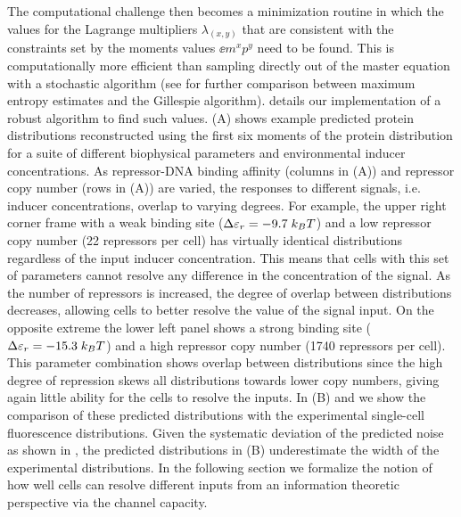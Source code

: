 The computational challenge then becomes a minimization routine in which the
values for the Lagrange multipliers $\lambda_{(x,y)}$ that are consistent with
the constraints set by the moments values $\ee{m^x p^y}$ need to be found. This
is computationally more efficient than sampling directly out of the master
equation with a stochastic algorithm (see  for further
comparison between maximum entropy estimates and the Gillespie algorithm).
 details our implementation of a robust algorithm to find
such values. (A) shows example predicted protein
distributions reconstructed using the first six moments of the protein
distribution for a suite of different biophysical parameters and environmental
inducer concentrations. As repressor-DNA binding affinity (columns in
(A)) and repressor copy number (rows in
(A)) are varied, the responses to different signals, i.e.
inducer concentrations, overlap to varying degrees. For example, the upper
right corner frame with a weak binding site ($\Delta\varepsilon_r = -9.7 \; k_BT$) and a low
repressor copy number (22 repressors per cell) has virtually identical
distributions regardless of the input inducer concentration. This means that
cells with this set of parameters cannot resolve any difference in the
concentration of the signal. As the number of repressors is increased, the
degree of overlap between distributions decreases, allowing cells to better
resolve the value of the signal input. On the opposite extreme the lower left
panel shows a strong binding site ($\Delta\varepsilon_r = -15.3 \; k_BT$) and a high repressor
copy number (1740 repressors per cell). This parameter combination shows
overlap between distributions since the high degree of repression skews all
distributions towards lower copy numbers, giving again little ability for the
cells to resolve the inputs. In (B) and 
we show the comparison of these predicted distributions with the experimental
single-cell fluorescence distributions. Given the systematic deviation of the
predicted noise as shown in , the predicted distributions
in (B) underestimate the width of the experimental
distributions. In the following section we formalize the notion of how well
cells can resolve different inputs from an information theoretic perspective
via the channel capacity.

